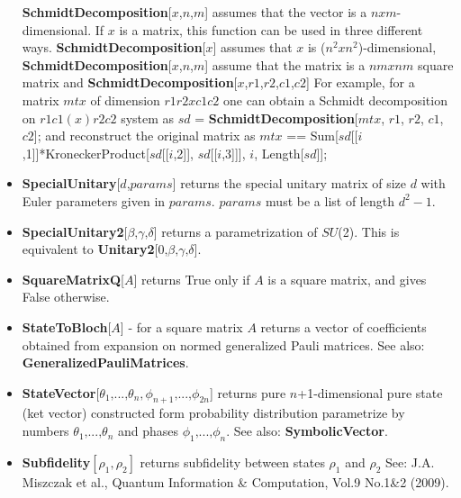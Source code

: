 \documentclass[a4paper,10pt]{scrartcl}
\begin{document}
\begin{itemize}
\indent{} \textbf{SchmidtDecomposition}[$x$,{$n$,$m$}] assumes that the vector is a $n xm$-dimensional.\newline{}
If $x$ is a matrix, this function can be used in three different ways.\newline{}
\indent{} \textbf{SchmidtDecomposition}[$x$] assumes that $x$ is ($n^2xn^2$)-dimensional, \newline{}
\indent{} \textbf{SchmidtDecomposition}[$x$,{$n$,$m$}] assume that the matrix is a $n mxn m$ square matrix and\newline{}
\indent{} \textbf{SchmidtDecomposition}[$x$,{{$r1$,$r2$},{$c1$,$c2$}}]\newline{}
For example, for a matrix $mtx$ of dimension $r1 r2x c1 c2$ one can obtain a Schmidt decomposition on $r1 c1(x) r2 c2$ system as \newline{}
\indent{} $sd$ = \textbf{SchmidtDecomposition}[$mtx$, {{$r1$, $r2$}, {$c1$, $c2$}}];\newline{}
and reconstruct the original matrix as\newline{}
\indent{} $mtx$ == Sum[$sd$[[$i$,1]]*KroneckerProduct[$sd$[[$i$,2]], $sd$[[$i$,3]]], {$i$, Length[$sd$]}];
\item  \textbf{SpecialUnitary}[$d$,$params$] returns the special unitary matrix of size $d$ with Euler parameters given in $params$. $params$ must be a list of length $d^2 - 1$.
\item  \textbf{SpecialUnitary2}[$\text{$\beta $,$\gamma $,$\delta $}$] returns a parametrization of $SU$(2). This is equivalent to \textbf{Unitary2}[$\text{0,$\beta $,$\gamma $,$\delta $}$].
\item  \textbf{SquareMatrixQ}[$A$] returns True only if $A$ is a square matrix, and gives False otherwise.
\item  \textbf{StateToBloch}[$A$] - for a square matrix $A$ returns a vector of coefficients obtained from expansion on normed generalized Pauli matrices. See also: \textbf{GeneralizedPauliMatrices}.
\item  \textbf{StateVector}[{$\theta _1\text{,...,}\theta _n,\phi _{n+1}\text{,...,}\phi _{2 n}$}] returns pure $n$+1-dimensional pure state (ket vector) constructed form probability distribution parametrize by numbers {$\theta _1\text{,...,}\theta _n$} and phases {$\phi _1\text{,...,}\phi _n$}. See also: \textbf{SymbolicVector}.
\item  \textbf{Subfidelity}$\left[\rho _1,\rho _2\right]$ returns subfidelity between states $\rho _1$ and $\rho _2$ See: J.A. Miszczak et al., Quantum Information \& Computation, Vol.9 No.1\&2 (2009).

\end{itemize}
\end{document}
